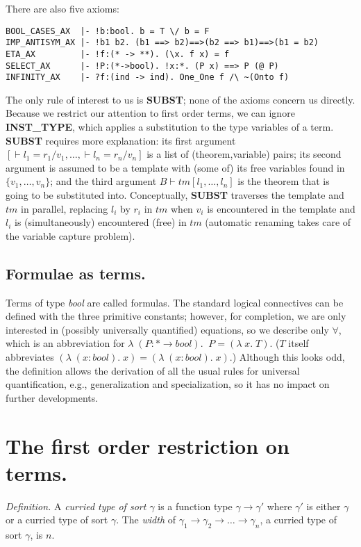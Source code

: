 There are also five axioms:
\begin{verbatim}
BOOL_CASES_AX  |- !b:bool. b = T \/ b = F
IMP_ANTISYM_AX |- !b1 b2. (b1 ==> b2)==>(b2 ==> b1)==>(b1 = b2)
ETA_AX         |- !f:(* -> **). (\x. f x) = f
SELECT_AX      |- !P:(*->bool). !x:*. (P x) ==> P (@ P)
INFINITY_AX    |- ?f:(ind -> ind). One_One f /\ ~(Onto f)
\end{verbatim}

The only rule of interest to us is {\bf SUBST}; none of the axioms concern us
directly. Because we restrict our attention to first order terms, we can ignore
{\bf INST\_TYPE}, which applies a substitution to the type variables of a term.
{\bf SUBST} requires more explanation: its first argument $[\vdash l_1=r_1/v_1,
\ldots, \vdash l_n=r_n/v_n]$ is a list of (theorem,variable) pairs; its second
argument is assumed to be a template with (some of) its free variables found in
$\{v_1, \ldots, v_n\}$; and the third argument $B \vdash tm[l_1, \ldots, l_n]$
is the theorem that is going to be substituted into. Conceptually, {\bf SUBST}
traverses the template and $tm$ in parallel, replacing $l_i$ by $r_i$ in $tm$
when $v_i$ is encountered in the template and $l_i$ is (simultaneously)
encountered (free) in $tm$ (automatic renaming takes care of the variable
capture problem).


\subsection{Formulae as terms.}

Terms of type {\em bool} are called formulas. The standard logical connectives
can be defined with the three primitive constants; however, for completion, we
are only interested in (possibly universally quantified) equations, so we
describe only $\forall$, which is an abbreviation for $\lambda\;(P:* \rightarrow
bool).\;\;P = (\lambda\;x.\;T)$. ($T$ itself  abbreviates $(\lambda\;(x:bool).\;x) =
(\lambda\;(x:bool).\;x)$.) Although this looks odd, the definition allows the
derivation of all the usual rules for universal quantification, e.g.,
generalization and specialization, so it has no impact on further developments.


\section{The first order restriction on terms.}

{\em Definition.} A {\em curried type of sort $\gamma$} is a function type
$\gamma \rightarrow \gamma'$ where $\gamma'$ is either $\gamma$ or a curried
type of sort $\gamma$. The {\em width} of $\gamma_1 \rightarrow \gamma_2
\rightarrow \ldots \rightarrow \gamma_n$, a curried type of sort $\gamma$, is
$n$.

